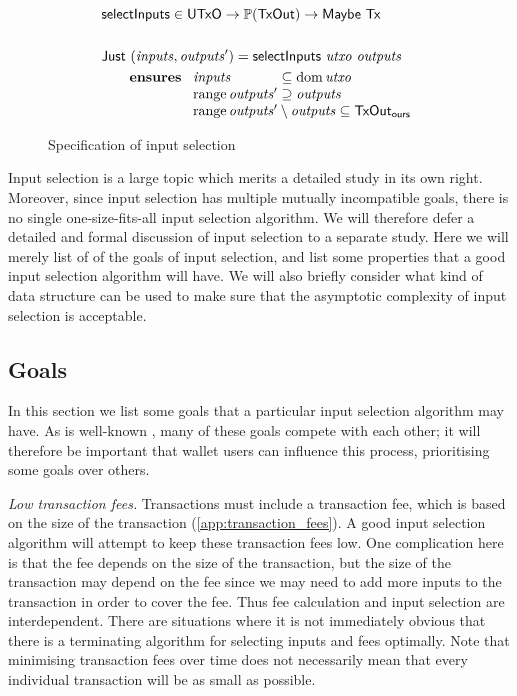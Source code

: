 \documentclass{article}
\DeclareMathOperator{\dom}{dom}
\DeclareMathOperator{\range}{range}
\theoremstyle{definition}{
  \newtheorem{lemma}{Lemma}[section] %
  \newtheorem{definition}[lemma]{Definition}
}
\theoremstyle{theorem}{
  \newtheorem{invariant}[lemma]{Invariant}
  \newtheorem{proofobligation}[lemma]{Proof Obligation}
}
\numberwithin{equation}{lemma}
\begin{document}
\begin{figure}
\begin{align*}
& \mathsf{selectInputs} \in \mathsf{UTxO} \to \mathbb{P}(\mathsf{TxOut}) \to \mathsf{Maybe} ~ \mathsf{Tx} \\
\\
& \mathsf{Just} ~ (\mathit{inputs}, \mathit{outputs}') = \mathsf{selectInputs} ~ \mathit{utxo} ~ \mathit{outputs} \\
& \qquad \mathbf{ensures~}
\begin{array}[t]{l@{\;}l@{\;}l}
\mathit{inputs}          & \subseteq & \dom \mathit{utxo} \\
\range \mathit{outputs}' & \supseteq & \mathit{outputs}   \\
\multicolumn{3}{l}{\range \mathit{outputs}' \setminus \mathit{outputs} \subseteq \mathsf{TxOut_{ours}}} \\
\end{array}
\end{align*}
\caption{\label{fig:input_selection_sig}Specification of input selection}
\end{figure}

Input selection is a large topic which merits a detailed study in its own right.
Moreover, since input selection has multiple mutually incompatible goals, there
is no single one-size-fits-all input selection algorithm.  We will therefore
defer a detailed and formal discussion of input selection to a separate study.
Here we will merely list of of the goals of input selection, and list some
properties that a good input selection algorithm will have. We will also
briefly consider what kind of data structure can be used to make sure that
the asymptotic complexity of input selection is acceptable.

\subsection{Goals}

In this section we list some goals that a particular input selection algorithm
may have. As is well-known \citep{lopp:challenges}, many of these goals compete
with each other; it will therefore be important that wallet users can influence
this process, prioritising some goals over others.

\emph{Low transaction fees.}
Transactions must include a transaction fee, which is based on the size of the
transaction (\cref{app:transaction_fees}). A good input selection
algorithm will attempt to keep these transaction fees low. One complication here
is that the fee depends on the size of the transaction, but the size of
the transaction may depend on the fee since we may need to add more inputs to
the transaction in order to cover the fee. Thus fee calculation and input
selection are interdependent. There are situations where it is not immediately
obvious that there is a terminating algorithm for selecting inputs and fees
optimally. Note that minimising transaction fees over time does not necessarily
mean that every individual transaction will be as small as possible.
\end{document}

